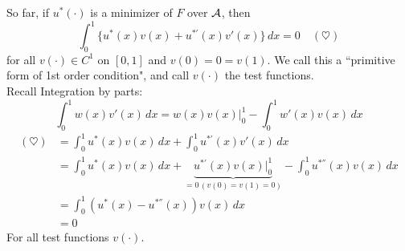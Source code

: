\documentclass[11pt]{article}
\begin{document}
So far, if $u^*(\cdot)$ is a minimizer of $F$ over $\mathcal{A}$, then
$$\int_0^1 \{u^*(x)v(x) + u^{*'}(x)v'(x)\} \, dx = 0 \quad (\heartsuit)$$
for all $v(\cdot) \in C^1$ on $[0,1]$ and $v(0) = 0 = v(1)$.
We call this a ``primitive form of 1st order condition", and call $v(\cdot)$ the test functions. \\
Recall Integration by parts:
$$\int_0^1 w(x)v'(x) \, dx = w(x)v(x)|_0^1 - \int_0^1 w'(x)v(x) \, dx$$
\begin{align}
	(\heartsuit) &= \int_0^1 u^*(x) v(x) \, dx + \int_0^1 u^{*'}(x) v'(x) \, dx \\
	&=  \int_0^1 u^*(x) v(x) \, dx + \underbrace{u^{*'}(x)v(x)|_0^1}_{=0 \, (v(0) = v(1) = 0)} - \int_0^1 u^{*''}(x)v(x) \, dx \\
	&= \int_0^1 \left(u^*(x) - u^{*''}(x)\right) v(x) \, dx \\
	&= 0
\end{align}
For all test functions $v(\cdot)$.\\
\end{document}
